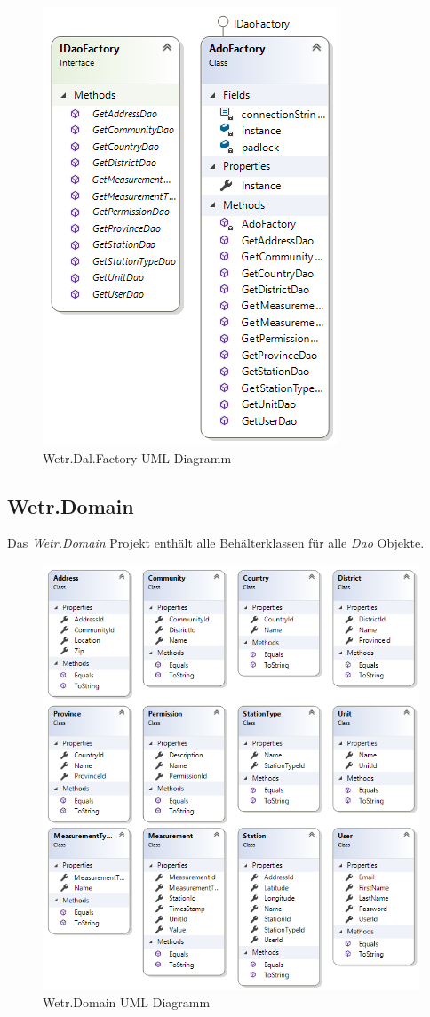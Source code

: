 \begin{figure}[H]
\centering
\includegraphics[width=.6\textwidth]{pictures/Wetr_Dal_Factory.png}
\caption{Wetr.Dal.Factory UML Diagramm}
\label{fig:Wetr.Dal.Factory}
\end{figure}
\raggedright

\newpage
\subsection{Wetr.Domain}
Das \textit{Wetr.Domain} Projekt enthält alle Behälterklassen für alle \textit{Dao} Objekte.

\begin{figure}[H]
\centering
\includegraphics[width=.9\textwidth]{pictures/Wetr_Domain.png}
\caption{Wetr.Domain UML Diagramm}
\label{fig:Wetr.Domain}
\end{figure}
\raggedright

